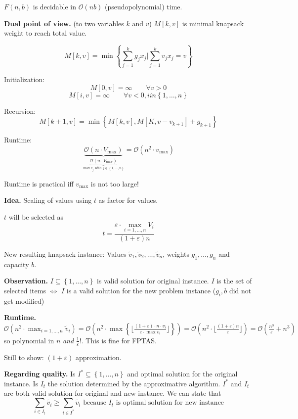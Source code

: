 \documentclass[a4paper]{article}
\newcommand{\cls}[1]{\rm{#1}}
\newcommand{\set}[1]{\left\{#1\right\}}
\begin{document}
$F(n, b)$ is decidable in $\mathcal{O}(nb)$ (pseudopolynomial) time.

\textbf{Dual point of view.} (to two variables $k$ and $v$)
  $M[k, v]$ is minimal knapsack weight to reach total value.

\[
  M[k, v] = \min\set{\sum_{j=1}^k g_j x_j | \sum_{j=1}^k v_j x_j = v}
\]

Initialization:
\[
  M[0, v] = \infty \qquad \forall v > 0
\] \[
  M[i, v] = \infty \qquad \forall v < 0, i in \set{1, \ldots, n}
\]

Recursion:
\[
  M[k+1, v] = \min\set{M[k, v], M[K, v - v_{k+1}] + g_{k+1}}
\]

Runtime:
\[
  \underbrace{\mathcal{O}(n \cdot V_{\text{max}})}_{
    \underbrace{\mathcal{O}(n \cdot V_{\text{max}})}_{
      \max{v_j} \text{ with } j \in \set{1, \ldots, n}
    }
  }
    = \mathcal{O}(n^2 \cdot v_{\text{max}})
\]

Runtime is practical iff $v_{\text{max}}$ is not too large!

\textbf{Idea.}
  Scaling of values using $t$ as factor for values.

$t$ will be selected as
\[
  t = \frac{\varepsilon \cdot \operatorname{max}_{i = 1,\ldots,n} V_i}
    {(1 + \varepsilon) n}
\]

New resulting knapsack instance:
Values $\tilde v_1, \tilde v_2, \ldots, \tilde v_n$, weights
$g_1, \ldots, g_n$ and capacity $b$.

\textbf{Observation.}
  $I \subseteq \set{1, \ldots, n}$ is valid solution for original instance.
  $I$ is the set of selected items $\Leftrightarrow$ $I$ is a valid solution
  for the new problem instance ($g_i, b$ did not get modified)

\textbf{Runtime.}
  $\mathcal{O}(n^2 \cdot \max_{i=1,\ldots,n} \tilde v_i) =
  \mathcal{O}(n^2 \cdot \max\set{\lfloor \frac
    {(1 + \varepsilon) \cdot n \cdot v_i}
    {\varepsilon \cdot \max{v_i}}
  \rfloor}) = \mathcal{O}(n^2 \cdot \lfloor\frac
    {(1 + \varepsilon) n}
    {\varepsilon}
  \rfloor) = \mathcal{O}(\frac{n^3}{\varepsilon} + n^3)$
  so polynomial in $n$ \emph{and} $\frac{1}{\varepsilon}!$.
  This is fine for \cls{FPTAS}.

Still to show: $(1 + \varepsilon)$ approximation.

\textbf{Regarding quality.}
  Is $I^* \subseteq \set{1, \ldots, n}$ and optimal solution for the original instance.
  Is $I_t$ the solution determined by the approximative algorithm.
  $I^*$ and $I_t$ are both valid solution for original and new instance.
  We can state that
  \[
    \sum_{i \in I_t} \tilde{v_i} \geq \sum_{i \in I^*} \tilde{v_i}
    \text{ because $I_t$ is optimal solution for new instance}
  \]
\end{document}
